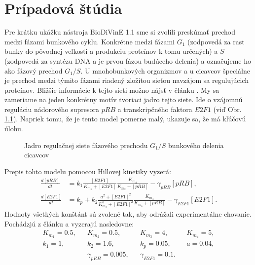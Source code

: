 \documentclass[11pt,final,oneside]{fithesis}
\begin{document}
\chapter{Pr\'ipadov\'a \v st\'udia}
Pre kr\'atku uk\'a\v zku n\'astroja BioDiVinE 1.1 sme si zvolili presk\'uma\v t prechod medzi f\'azami bunkov\'eho cyklu. Konkr\'etne medzi f\'azami $G_1$ 
(zodpoved\'a za rast bunky do p\^ ovodnej ve\v lkosti a produkciu prote\'inov k tomu ur\v cen\'ych) a $S$ (zodpoved\'a za synt\'ezu DNA a je prvou 
f\'azou bud\'uceho delenia) a ozna\v cujeme ho ako f\'azov\'y prechod $G_1/S$. U mnohobunkov\'ych organizmov a u cicavcov \v speci\'alne je prechod medzi t\'ymito f\'azami riaden\'y zlo\v zitou sie\v tou
navz\'ajom sa reguluj\'ucich prote\'inov. Bli\v z\v sie inform\'acie k tejto sieti mo\v zno n\'ajs\v t v \v cl\'anku \cite{Swat:2004}. My sa zameriame na
jeden konkr\'etny mot\'iv tvoriaci jadro tejto siete. Ide o vz\'ajomn\'u regul\'aciu n\'adorov\'eho supresora $pRB$ a transkrip\v cn\'eho faktora $E2F1$ 
(vi\v d Obr. \ref{fig:caseStudy}). Napriek tomu, \v ze je tento model pomerne mal\'y, ukazuje sa, \v ze m\'a k\v l\'u\v cov\'u \'ulohu.
\begin{figure}[h]
\centering
{}
\caption{Jadro regula\v cnej siete f\'azov\'eho prechodu $G_1/S$ bunkov\'eho delenia cicavcov}
\label{fig:caseStudy}
\end{figure}

Prepis tohto modelu pomocou Hillovej kinetiky vyzer\'a:
\begin{align}
\frac{d[pRB]}{dt} &= k_1 \frac{[E2F1]}{K_{m_1} + [E2F1]}\frac{K_{m_2}}{K_{m_2} + [pRB]} - \gamma_{pRB}[pRB],\\
\frac{d[E2F1]}{dt} &= k_p + k_2 \frac{a^2 + [E2F1]^2}{K_{m_3}^2 + [E2F1]^2}\frac{K_{m_4}}{K_{m_4} + [pRB]} - \gamma_{E2F1}[E2F1].
\end{align}
Hodnoty v\v setk\'ych kon\v st\'ant s\'u zvolen\'e tak, aby odr\'a\v zali experiment\'alne chovanie. Poch\'adzj\'u z \v cl\'anku \cite{Swat:2004} a 
vyzeraj\'u nasledovne:
\begin{align}
&K_{m_1} = 0.5,& &K_{m_2} = 0.5,& &K_{m_3} = 4,& &K_{m_4} = 5,\\
&k_1 = 1,& &k_2 = 1.6,& &k_p = 0.05,& &a = 0.04,\\
& & &\gamma_{pRB} = 0.005,& &\gamma_{E2F1} = 0.1.& & &
\end{align}
\end{document}
